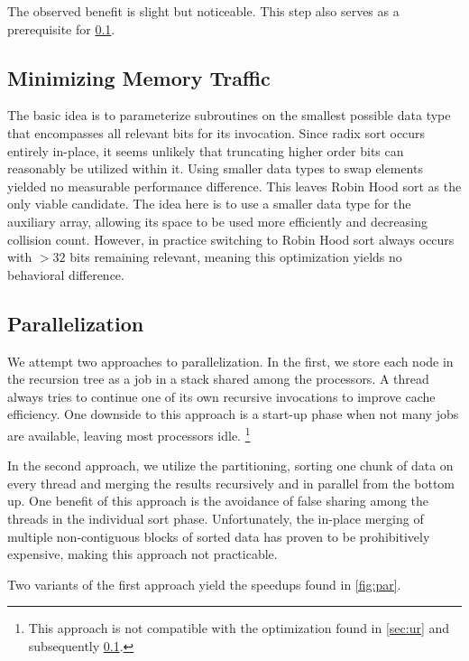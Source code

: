 \documentclass[a4paper,UKenglish,cleveref, autoref, thm-restate]{template/lipics-v2021}
\begin{document}
	The observed benefit is slight but noticeable.
	This step also serves as a prerequisite for \cref{sec:mmt}.
	
	\subsection{Minimizing Memory Traffic}
	\label{sec:mmt}
	
	The basic idea is to parameterize subroutines on the smallest possible data type that encompasses all relevant bits for its invocation.
	Since radix sort occurs entirely in-place, it seems unlikely that truncating higher order bits can reasonably be utilized within it.
	Using smaller data types to swap elements yielded no measurable performance difference.
	This leaves Robin Hood sort as the only viable candidate.
	The idea here is to use a smaller data type for the auxiliary array, allowing its space to be used more efficiently and decreasing collision count.
	However, in practice switching to Robin Hood sort always occurs with $>32$ bits remaining relevant, meaning this optimization yields no behavioral difference.
	
	\subsection{Parallelization}
	
	We attempt two approaches to parallelization.
	In the first, we store each node in the recursion tree as a job in a stack shared among the processors.
	A thread always tries to continue one of its own recursive invocations to improve cache efficiency.
	One downside to this approach is a start-up phase when not many jobs are available, leaving most processors idle.
	\footnote{This approach is not compatible with the optimization found in \cref{sec:ur} and subsequently \cref{sec:mmt}.}
	
	In the second approach, we utilize the partitioning, sorting one chunk of data on every thread and merging the results recursively and in parallel from the bottom up.
	One benefit of this approach is the avoidance of false sharing among the threads in the individual sort phase.
	Unfortunately, the in-place merging of multiple non-contiguous blocks of sorted data has proven to be prohibitively expensive, making this approach not practicable.
	
	Two variants of the first approach yield the speedups found in \cref{fig:par}.
	
\end{document}
